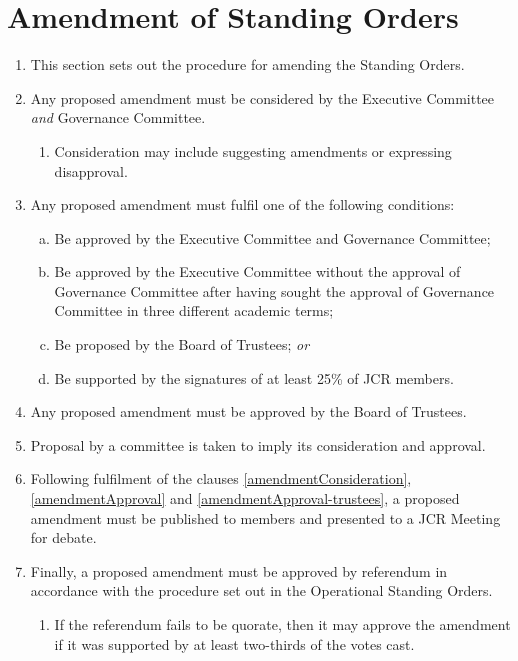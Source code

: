 \documentclass[12pt]{article}
\begin{document}
\section{Amendment of Standing Orders}
\begin{enumerate}
    \item This section sets out the procedure for amending the Standing Orders.
    \item\label{amendmentConsideration} Any proposed amendment must be considered by the Executive Committee \emph{and} Governance Committee.
    \begin{enumerate}
        \item Consideration may include suggesting amendments or expressing disapproval.
    \end{enumerate}
    \item Any proposed amendment must fulfil one of the following conditions:\label{amendmentApproval}
    \begin{enumerate}[(a)]
        \item Be approved by the Executive Committee and Governance Committee;
        \item Be approved by the Executive Committee without the approval of Governance Committee after having sought the approval of Governance Committee in three different academic terms;
        \item Be proposed by the Board of Trustees; \emph{or}
        \item Be supported by the signatures of at least 25\% of JCR members.
    \end{enumerate}
    \item Any proposed amendment must be approved by the Board of Trustees.\label{amendmentApproval-trustees}
    \item Proposal by a committee is taken to imply its consideration and approval.
    \item\label{amendmentDebate}Following fulfilment of the clauses \ref{amendmentConsideration}, \ref{amendmentApproval} and \ref{amendmentApproval-trustees}, a proposed amendment must be published to members and presented to a JCR Meeting for debate.
    \item Finally, a proposed amendment must be approved by referendum in accordance with the procedure set out in the Operational Standing Orders.
    \begin{enumerate}
        \item If the referendum fails to be quorate, then it may approve the amendment if it was supported by at least two-thirds of the votes cast.

\end{enumerate}
\end{enumerate}
\end{document}
